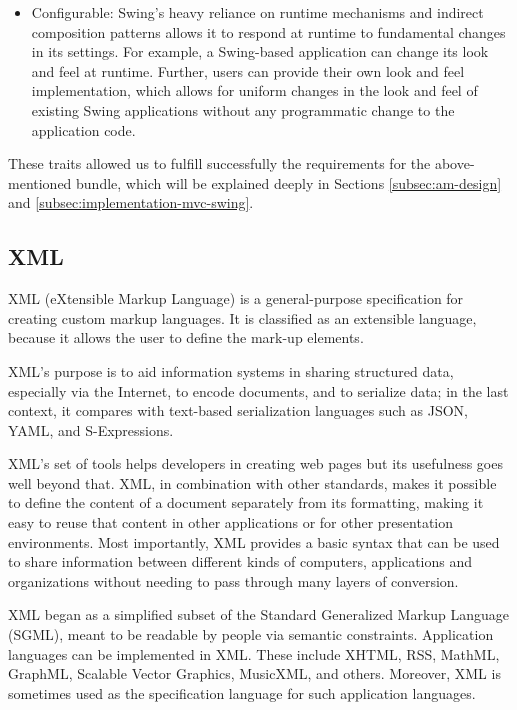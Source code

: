\begin{itemize}
	\item Configurable: Swing's heavy reliance on runtime mechanisms and indirect 
	composition patterns allows it to respond at runtime to fundamental changes 
	in its settings. For example, a Swing-based application can change its look 
	and feel at runtime. Further, users can provide their own look and feel 
	implementation, which allows for uniform changes in the look and feel of 
	existing Swing applications without any programmatic change to the application
	code.
\end{itemize}

These traits allowed us to fulfill successfully the requirements for the
above-mentioned bundle, which will be explained deeply in Sections
\ref{subsec:am-design} and \ref{subsec:implementation-mvc-swing}.

\subsection{XML}
\label{subsec:tech-xml}
XML (eXtensible Markup Language) is a general-purpose specification for
creating  custom markup languages. It is classified as an extensible
language,  because it allows the user to define the mark-up elements.

XML's purpose is to aid information systems in sharing structured data, 
especially via the Internet, to encode documents, and to serialize data;  in
the last context, it compares with text-based serialization languages such as 
JSON, YAML, and S-Expressions.

XML's set of tools helps developers in creating web pages but its usefulness
goes well beyond that. XML, in combination with other standards, makes  it
possible to define the content of a document separately from its formatting, 
making it easy to reuse that content in other applications or for other 
presentation environments. Most importantly, XML provides a basic syntax  that
can be used to share information between different kinds of computers, 
applications and organizations without needing to  pass
through many layers of conversion.

XML began as a simplified subset of the Standard Generalized Markup Language 
(SGML), meant to be readable by people via semantic constraints.
Application languages can be implemented in XML. These include XHTML, RSS,
MathML, GraphML, Scalable Vector Graphics, MusicXML, and others. Moreover, XML
is sometimes used as the specification language for such application languages.

